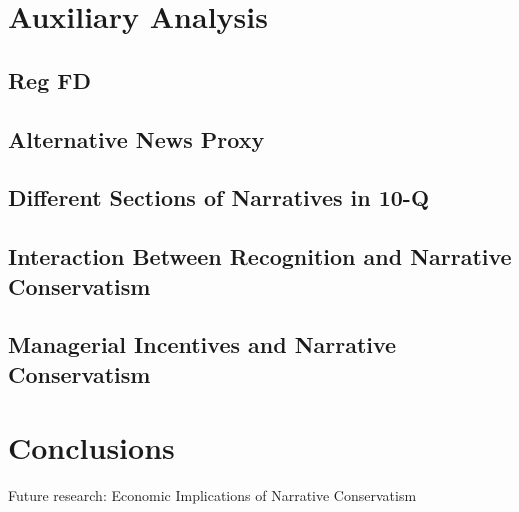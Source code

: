 \documentclass[a4paper]{article}
\begin{document}
\begin{spacing}{2}
\section{Auxiliary Analysis}

\subsection{Reg FD}

\subsection{Alternative News Proxy}

\subsection{Different Sections of Narratives in 10-Q}

\subsection{Interaction Between Recognition and Narrative Conservatism}

\subsection{Managerial Incentives and Narrative Conservatism}

\section{Conclusions}

Future research: Economic Implications of Narrative Conservatism

\end{spacing}

\newpage



\newpage


\newpage


\newpage


\newpage
\setcounter{page}{1}

\end{document}
